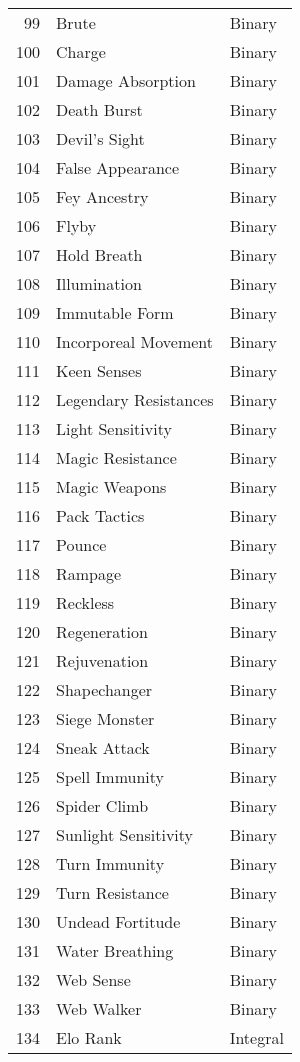 \documentclass[12pt]{diazessay}
\begin{document}
\begin{table}[ht]
\begin{tiny}
\begin{minipage}[b]{0.45\linewidth}
\begin{tabular}{@{}rll@{}}
	99 & Brute & Binary \\
	100 & Charge & Binary \\
	101 & Damage Absorption & Binary \\
	102 & Death Burst & Binary \\
	103 & Devil's Sight & Binary \\
	104 & False Appearance & Binary \\
	105 & Fey Ancestry & Binary \\
	106 & Flyby & Binary \\
	107 & Hold Breath & Binary \\
	108 & Illumination & Binary \\
	109 & Immutable Form & Binary \\
	110 & Incorporeal Movement & Binary \\
	111 & Keen Senses & Binary \\
	112 & Legendary Resistances & Binary \\
	113 & Light Sensitivity & Binary \\
	114 & Magic Resistance & Binary \\
	115 & Magic Weapons & Binary \\
	116 & Pack Tactics & Binary \\
	117 & Pounce & Binary \\
	118 & Rampage & Binary \\
	119 & Reckless & Binary \\
	120 & Regeneration & Binary \\
	121 & Rejuvenation & Binary \\
	122 & Shapechanger & Binary \\
	123 & Siege Monster & Binary \\
	124 & Sneak Attack & Binary \\
	125 & Spell Immunity & Binary \\
	126 & Spider Climb & Binary \\
	127 & Sunlight Sensitivity & Binary \\
	128 & Turn Immunity & Binary \\
	129 & Turn Resistance & Binary \\
	130 & Undead Fortitude & Binary \\
	131 & Water Breathing & Binary \\
	132 & Web Sense & Binary \\
	133 & Web Walker & Binary \\
	134 & Elo Rank & Integral \\
	\bottomrule
\end{tabular}
\end{minipage}
\end{tiny}

\end{table}
\end{document}
